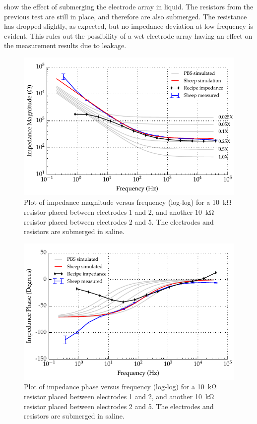  show the effect of submerging the electrode array in liquid. The resistors from the previous test are still in place, and therefore are also submerged.
The resistance has dropped slightly, as expected, but no impedance deviation at low frequency is evident.
This rules out the possibility of a wet electrode array having an effect on the measurement results due to leakage.

\begin{figure}
    \centering
    \includegraphics[width=\textwidth]{content/appendices/Solution-Impedance-Measurements/graphics/run14_calibration_10k_water_salt_amended_ZVsF_graph_mag}
    \caption{\label{fig:calibration_10kRes_saline_mag}Plot of impedance magnitude versus frequency (log-log) for a \SI{10}{\kilo\ohm} resistor placed between electrodes 1 and 2, and another \SI{10}{\kilo\ohm} resistor placed between electrodes 2 and 5. The electrodes and resistors are submerged in saline.}
\end{figure}

\begin{figure}
    \centering
    \includegraphics[width=\textwidth]{content/appendices/Solution-Impedance-Measurements/graphics/run14_calibration_10k_water_salt_amended_ZVsF_graph_phase}
    \caption{\label{fig:calibration_10kRes_saline_phase}Plot of impedance phase versus frequency (log-log) for a \SI{10}{\kilo\ohm} resistor placed between electrodes 1 and 2, and another \SI{10}{\kilo\ohm} resistor placed between electrodes 2 and 5. The electrodes and resistors are submerged in saline.}
\end{figure}

